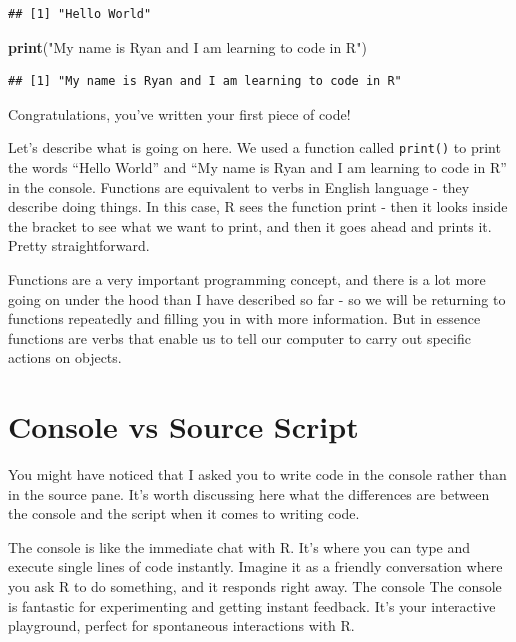 \documentclass[
]{book}
\newenvironment{Shaded}{\begin{snugshade}}{\end{snugshade}}
\newcommand{\FunctionTok}[1]{\textcolor[rgb]{0.13,0.29,0.53}{\textbf{#1}}}
\newcommand{\NormalTok}[1]{#1}
\newcommand{\StringTok}[1]{\textcolor[rgb]{0.31,0.60,0.02}{#1}}
\begin{document}
\begin{verbatim}
## [1] "Hello World"
\end{verbatim}

\begin{Shaded}
\begin{Highlighting}[]
\FunctionTok{print}\NormalTok{(}\StringTok{"My name is Ryan and I am learning to code in R"}\NormalTok{)}
\end{Highlighting}
\end{Shaded}

\begin{verbatim}
## [1] "My name is Ryan and I am learning to code in R"
\end{verbatim}

Congratulations, you've written your first piece of code!

Let's describe what is going on here. We used a function called \texttt{print()} to print the words ``Hello World'' and ``My name is Ryan and I am learning to code in R'' in the console. Functions are equivalent to verbs in English language - they describe doing things. In this case, R sees the function print - then it looks inside the bracket to see what we want to print, and then it goes ahead and prints it. Pretty straightforward.

Functions are a very important programming concept, and there is a lot more going on under the hood than I have described so far - so we will be returning to functions repeatedly and filling you in with more information. But in essence functions are verbs that enable us to tell our computer to carry out specific actions on objects.

\hypertarget{console-vs-source-script}{%
\section{Console vs Source Script}\label{console-vs-source-script}}

You might have noticed that I asked you to write code in the console rather than in the source pane. It's worth discussing here what the differences are between the console and the script when it comes to writing code.

The console is like the immediate chat with R. It's where you can type and execute single lines of code instantly. Imagine it as a friendly conversation where you ask R to do something, and it responds right away. The console The console is fantastic for experimenting and getting instant feedback. It's your interactive playground, perfect for spontaneous interactions with R.
\end{document}

